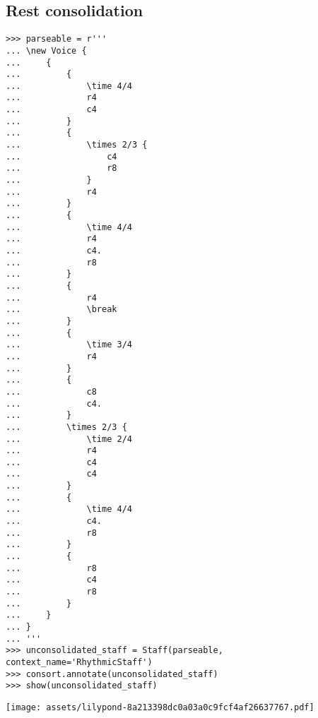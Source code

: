 \subsection{Rest consolidation}

\begin{comment}
<abjad>
parseable = r'''
\new Voice {
    {
        {
            \time 4/4
            r4
            c4
        }
        {
            \times 2/3 {
                c4
                r8
            }
            r4
        }
        {
            \time 4/4
            r4
            c4.
            r8
        }
        {
            r4
            \break
        }
        {
            \time 3/4
            r4
        }
        {
            c8
            c4.
        }
        \times 2/3 {
            \time 2/4
            r4
            c4
            c4
        }
        {
            \time 4/4
            c4.
            r8
        }
        {
            r8
            c4
            r8
        }
    }
}
'''
unconsolidated_staff = Staff(parseable, context_name='RhythmicStaff')
consort.annotate(unconsolidated_staff)
show(unconsolidated_staff)
</abjad>
\end{comment}

\begin{singlespacing}
\vspace{-0.5\baselineskip}
\begin{lstlisting}
>>> parseable = r'''
... \new Voice {
...     {
...         {
...             \time 4/4
...             r4
...             c4
...         }
...         {
...             \times 2/3 {
...                 c4
...                 r8
...             }
...             r4
...         }
...         {
...             \time 4/4
...             r4
...             c4.
...             r8
...         }
...         {
...             r4
...             \break
...         }
...         {
...             \time 3/4
...             r4
...         }
...         {
...             c8
...             c4.
...         }
...         \times 2/3 {
...             \time 2/4
...             r4
...             c4
...             c4
...         }
...         {
...             \time 4/4
...             c4.
...             r8
...         }
...         {
...             r8
...             c4
...             r8
...         }
...     }
... }
... '''
>>> unconsolidated_staff = Staff(parseable, context_name='RhythmicStaff')
>>> consort.annotate(unconsolidated_staff)
>>> show(unconsolidated_staff)
\end{lstlisting}
\noindent\texttt{[image: assets/lilypond-8a213398dc0a03a0c9fcf4af26637767.pdf]}
\end{singlespacing}

